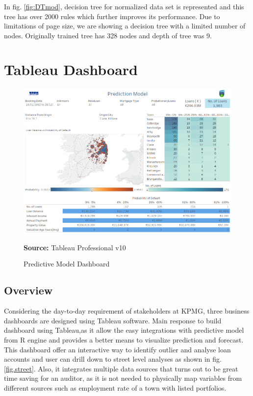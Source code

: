 In fig. \ref{fig:DTmod}, decision tree for normalized data set is represented and this tree has over 2000 rules which further improves its performance. Due to limitations of page size, we are showing a decision tree with a limited number of nodes. Originally trained tree has 328 nodes and depth of tree was 9. 


\section{Tableau Dashboard}

\begin{center}
\begin{figure}[!htb]
\includegraphics[width=\textwidth]{Predictive.png}
\centering
\caption{Predictive Model Dashboard}{\textbf{Source:} Tableau Professional v10}
\label{fig:overview}
\end{figure}
\end{center}

\subsection{Overview}

Considering the day-to-day requirement of stakeholders at KPMG, three business dashboards are designed using Tableau software. Main response to build dashboard using Tableau,as it allow the easy integrations with predictive model from R engine and provides a better means to visualize prediction and forecast. This dashboard offer an interactive way to identify outlier and analyse loan accounts and user can drill down to street level analyses as shown in fig.\ref{fig.street}. Also, it integrates multiple data sources that turns out to be great time saving for an auditor, as it is not needed to physically map variables from different sources such as employment rate of a town with listed portfolios.\\

